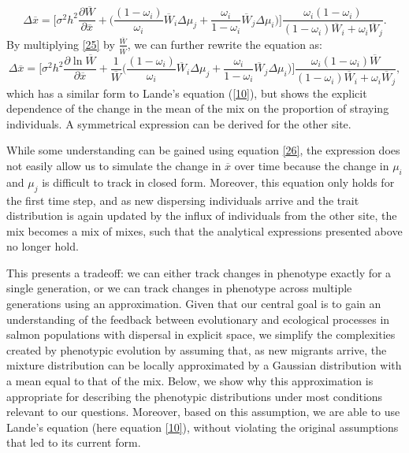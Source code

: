 \documentclass{revtex4}
\begin{document}
\begin{equation}\label{25}
\Delta\overline{x}=\Big[ \sigma^{2}h^{2}\frac{\partial \overline{W}}{\partial \overline{x}} + \Big(\frac{(1-\omega_i)}{\omega_i}\overline{W}_{i}\Delta\mu_{j}+\frac{\omega_i}{1-\omega_i}\overline{W}_{j}\Delta\mu_{i} \Big) \Big] \frac{\omega_i(1-\omega_i)}{(1-\omega_i)\overline{W}_{i}+\omega_i\overline{W}_{j}}.
\end{equation}
By multiplying \ref{25} by $\frac{\overline{W}}{\overline{W}}$, we can further rewrite the equation as:
\begin{equation}\label{26}
\Delta\overline{x}=\Big[ \sigma^{2}h^{2}\frac{\partial \ln\overline{W}}{\partial \overline{x}} + \frac{1}{\overline{W}}\Big(\frac{(1-\omega_i)}{\omega_i}\overline{W}_{i}\Delta\mu_{j}+\frac{\omega_i}{1-\omega_i}\overline{W}_{j}\Delta\mu_{i} \Big) \Big] \frac{\omega_i(1-\omega_i)\overline{W}}{(1-\omega_i)\overline{W}_{i}+\omega_i\overline{W}_{j}},
\end{equation}
which has a similar form to Lande's equation (\ref{10}), but shows the explicit dependence of the change in the mean of the mix on the proportion of straying individuals. A symmetrical expression can be derived for the other site. 

While some understanding can be gained using equation \ref{26}, the expression does not easily allow us to simulate the change in $\overline{x}$ over time because the change in $\mu_{i}$ and $\mu_{j}$ is difficult to track in closed form. Moreover, this equation only holds for the first time step, and as new dispersing individuals arrive and the trait distribution is again updated by the influx of individuals from the other site, the mix becomes a mix of mixes, such that the analytical expressions presented above no longer hold. 

This presents a tradeoff: we can either track changes in phenotype exactly for a single generation, or we can track changes in phenotype across multiple generations using an approximation. Given that our central goal is to gain an understanding of the feedback between evolutionary and ecological processes in salmon populations with dispersal in explicit space, we simplify the complexities created by phenotypic evolution by assuming that, as new migrants arrive, the mixture distribution can be locally approximated by a Gaussian distribution with a mean equal to that of the mix. Below, we show why this approximation is appropriate for describing the phenotypic distributions under most conditions relevant to our questions. Moreover, based on this assumption, we are able to use Lande's equation (here equation \ref{10}), without violating the original assumptions that led to its current form.
\end{document}
